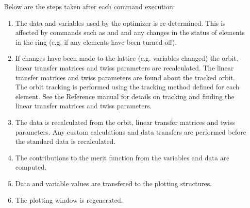 Below are the steps taken after each \tao command execution:
\begin{enumerate}
  \item The data and variables used by the optimizer is re-determined. This is
affected by commands such as  and  and any changes in the
status of elements in the ring (e.g. if any elements have been turned off). 
  \item If changes have been made to the lattice (e.g. variables changed) the
 orbit, linear transfer matrices and twiss parameters are recalculated. 
The linear transfer matrices and twiss parameters are found about the tracked
orbit. The orbit tracking is performed using the tracking method defined for
each element. See the \bmad Reference manual for details on tracking and finding
the linear transfer matrices and twiss parameters.
  \item The  data is recalculated from the  orbit, linear
transfer matrices and twiss parameters. Any custom calculations and data
transfers are performed before the standard \tao data is recalculated.
  \item The contributions to the merit function from the variables and data are
computed.
  \item Data and variable values are transfered to the plotting structures.
  \item The plotting window is regenerated.
\end{enumerate}

